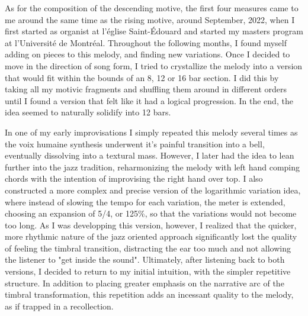 \documentclass[12pt,twoside,maitrise]{dms_ks}
\theoremstyle{definition}
\begin{document}

As for the composition of the descending motive, the first four measures came to me around the same time as the rising motive, around September, 2022, when I first started as organist at l'église Saint-Édouard and started my masters program at l'Université de Montréal.  
Throughout the following months, I found myself adding on pieces to this melody, and finding new variations.  
Once I decided to move in the direction of song form, I tried to crystallize the melody into a version that would fit within the bounds of an 8, 12 or 16 bar section. 
I did this by taking all my motivic fragments and shuffling them around in different orders until I found a version that felt like it had a logical progression.  
In the end, the idea seemed to naturally solidify into 12 bars.

In one of my early improvisations I simply repeated this melody several times as the voix humaine synthesis underwent it's painful transition into a bell, eventually dissolving into a textural mass.
However, I later had the idea to lean further into the jazz tradition, reharmonizing the melody with left hand comping chords with the intention of improvising the right hand over top. 
I also constructed a more complex and precise version of the logarithmic variation idea, where instead of slowing the tempo for each variation, the meter is extended, choosing an expansion of 5/4, or 125\%, so that the variations would not become too long. 
As I was developping this version, however, I realized that the quicker, more rhythmic nature of the jazz oriented approach significantly lost the quality of feeling the timbral transition, distracting the ear too much and not allowing the listener to "get inside the sound". 
Ultimately, after listening back to both versions, I decided to return to my initial intuition, with the simpler repetitive structure. 
In addition to placing greater emphasis on the narrative arc of the timbral transformation, this repetition adds an incessant quality to the melody, as if trapped in a recollection.

\end{document}
